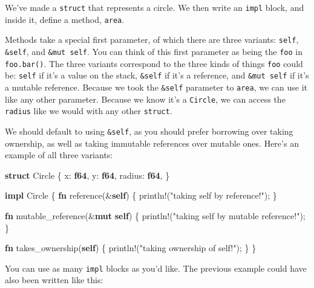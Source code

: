\documentclass[a4paper,]{book}
\newenvironment{Shaded}{\begin{snugshade}}{\end{snugshade}}
\newcommand{\KeywordTok}[1]{\textcolor[rgb]{0.13,0.29,0.53}{\textbf{{#1}}}}
\newcommand{\StringTok}[1]{\textcolor[rgb]{0.31,0.60,0.02}{{#1}}}
\newcommand{\OtherTok}[1]{\textcolor[rgb]{0.56,0.35,0.01}{{#1}}}
\newcommand{\NormalTok}[1]{{#1}}
\begin{document}
We've made a \texttt{struct} that represents a circle. We then write an
\texttt{impl} block, and inside it, define a method, \texttt{area}.

Methods take a special first parameter, of which there are three
variants: \texttt{self}, \texttt{\&self}, and \texttt{\&mut\ self}. You
can think of this first parameter as being the \texttt{foo} in
\texttt{foo.bar()}. The three variants correspond to the three kinds of
things \texttt{foo} could be: \texttt{self} if it's a value on the
stack, \texttt{\&self} if it's a reference, and \texttt{\&mut\ self} if
it's a mutable reference. Because we took the \texttt{\&self} parameter
to \texttt{area}, we can use it like any other parameter. Because we
know it's a \texttt{Circle}, we can access the \texttt{radius} like we
would with any other \texttt{struct}.

We should default to using \texttt{\&self}, as you should prefer
borrowing over taking ownership, as well as taking immutable references
over mutable ones. Here's an example of all three variants:

\begin{Shaded}
\begin{Highlighting}[]
\KeywordTok{struct} \NormalTok{Circle \{}
    \NormalTok{x: }\KeywordTok{f64}\NormalTok{,}
    \NormalTok{y: }\KeywordTok{f64}\NormalTok{,}
    \NormalTok{radius: }\KeywordTok{f64}\NormalTok{,}
\NormalTok{\}}

\KeywordTok{impl} \NormalTok{Circle \{}
    \KeywordTok{fn} \NormalTok{reference(&}\KeywordTok{self}\NormalTok{) \{}
       \OtherTok{println!}\NormalTok{(}\StringTok{"taking self by reference!"}\NormalTok{);}
    \NormalTok{\}}

    \KeywordTok{fn} \NormalTok{mutable_reference(&}\KeywordTok{mut} \KeywordTok{self}\NormalTok{) \{}
       \OtherTok{println!}\NormalTok{(}\StringTok{"taking self by mutable reference!"}\NormalTok{);}
    \NormalTok{\}}

    \KeywordTok{fn} \NormalTok{takes_ownership(}\KeywordTok{self}\NormalTok{) \{}
       \OtherTok{println!}\NormalTok{(}\StringTok{"taking ownership of self!"}\NormalTok{);}
    \NormalTok{\}}
\NormalTok{\}}
\end{Highlighting}
\end{Shaded}

You can use as many \texttt{impl} blocks as you'd like. The previous
example could have also been written like this:
\end{document}
